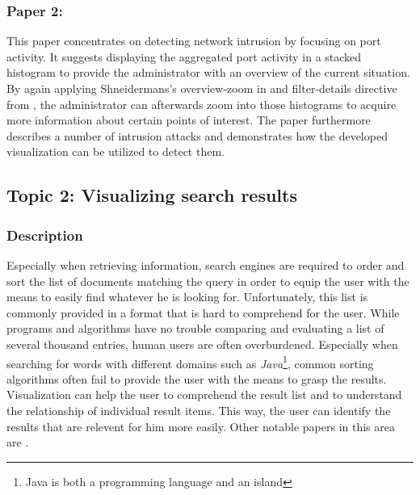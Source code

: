 \subsubsection{Paper 2: \cite{network:abdullah}}
This paper concentrates on detecting network intrusion by focusing on port activity. It suggests displaying the aggregated port activity in a stacked histogram to provide the administrator with an overview of the current situation. By again applying Shneidermans's overview-zoom in and filter-details directive from \cite{visualization:shneiderman}, the administrator can afterwards zoom into those histograms to acquire more information about certain points of interest. The paper furthermore describes a number of intrusion attacks and demonstrates how the developed visualization can be utilized to detect them.


\subsection{Topic 2: Visualizing search results}
\subsubsection{Description}
Especially when retrieving information, search engines are required to order and sort the list of documents matching the query in order to equip the user with the means to easily find whatever he is looking for. Unfortunately, this list is commonly provided in a format that is hard to comprehend for the user. While programs and algorithms have no trouble comparing and evaluating a list of several thousand entries, human users are often overburdened. Especially when searching for words with different domains such as \emph{Java}\footnote{Java is both a programming language and an island}, common sorting algorithms often fail to provide the user with the means to grasp the results. Visualization can help the user to comprehend the result list and to understand the relationship of individual result items. This way, the user can identify the results that are relevent for him more easily. Other notable papers in this area are \cite{search:other:lijn, search:other:rauber, search:other:benjamin, search:other:einsfeld, search:other:weippl, search:other:nowell, search:other:alonso, search:other:mukherje2, search:other:paulovich, search:other:konchady, search:other:tvarozek, search:other:hoeber, search:other:mukherjea, search:other:wong, search:other:russinov}.


